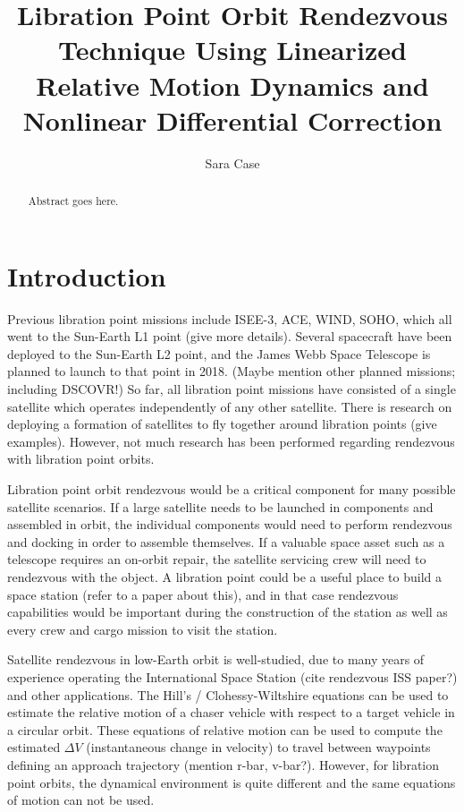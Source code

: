 \documentclass[a4paper]{article}
\title{Libration Point Orbit Rendezvous Technique Using Linearized Relative Motion Dynamics and Nonlinear Differential Correction}
\author{Sara Case}
\begin{document}
\maketitle

\begin{abstract}
	
	Abstract goes here.

\end{abstract}

\section{Introduction}

Previous libration point missions include ISEE-3, ACE, WIND, SOHO, which all went to the Sun-Earth L1 point (give more details).  Several spacecraft have been deployed to the Sun-Earth L2 point, and the James Webb Space Telescope is planned to launch to that point in 2018.  (Maybe mention other planned missions; including DSCOVR!)  So far, all libration point missions have consisted of a single satellite which operates independently of any other satellite.  There is research on deploying a formation of satellites to fly together around libration points (give examples).  However, not much research has been performed regarding rendezvous with libration point orbits.

Libration point orbit rendezvous would be a critical component for many possible satellite scenarios.  If a large satellite needs to be launched in components and assembled in orbit, the individual components would need to perform rendezvous and docking in order to assemble themselves.  If a valuable space asset such as a telescope requires an on-orbit repair, the satellite servicing crew will need to rendezvous with the object.  A libration point could be a useful place to build a space station (refer to a paper about this), and in that case rendezvous capabilities would be important during the construction of the station as well as every crew and cargo mission to visit the station.

Satellite rendezvous in low-Earth orbit is well-studied, due to many years of experience operating the International Space Station (cite rendezvous ISS paper?) and other applications.  The Hill's / Clohessy-Wiltshire equations can be used to estimate the relative motion of a chaser vehicle with respect to a target vehicle in a circular orbit.  These equations of relative motion can be used to compute the estimated \(\Delta V\) (instantaneous change in velocity) to travel between waypoints defining an approach trajectory (mention r-bar, v-bar?).  However, for libration point orbits, the dynamical environment is quite different and the same equations of motion can not be used.
\end{document}
